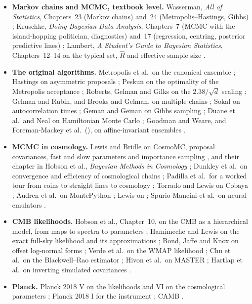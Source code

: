 \begin{itemize}[itemsep=2pt,leftmargin=1.2em]
  \item \textbf{Markov chains and MCMC, textbook level.} Wasserman, \emph{All of Statistics}, Chapters~23 (Markov chains)
        and~24 (Metropolis--Hastings, Gibbs) ; Kruschke, \emph{Doing Bayesian Data Analysis},
        Chapters~7 (MCMC with the island-hopping politician, diagnostics) and~17 (regression, centring, posterior
        predictive lines) ; Lambert, \emph{A Student's Guide to Bayesian Statistics},
        Chapters~12--14 on the typical set, $\hat R$ and effective sample size .
  \item \textbf{The original algorithms.} Metropolis et al.\ on the canonical ensemble \cite{Metropolis1953}; Hastings on
        asymmetric proposals \cite{Hastings1970}; Peskun on the optimality of the Metropolis acceptance \cite{Peskun1973};
        Roberts, Gelman and Gilks on the $2.38/\sqrt d$ scaling \cite{RobertsGelmanGilks1997}; Gelman and Rubin, and Brooks
        and Gelman, on multiple chains \cite{GelmanRubin1992,BrooksGelman1998}; Sokal on autocorrelation times
        \cite{Sokal1997}; Geman and Geman on Gibbs sampling \cite{GemanGeman1984}; Duane et al.\ and Neal on Hamiltonian
        Monte Carlo \cite{Duane1987,Neal2011}; Goodman and Weare, and Foreman-Mackey et al.\ (), on
        affine-invariant ensembles \cite{GoodmanWeare2010,ForemanMackey2013}.
  \item \textbf{MCMC in cosmology.} Lewis and Bridle on CosmoMC, proposal covariances, fast and slow parameters and
        importance sampling \cite{LewisBridle2002}, and their chapter in Hobson et al., \emph{Bayesian Methods in Cosmology}
        ; Dunkley et al.\ on convergence and efficiency of cosmological chains \cite{Dunkley2005};
        Padilla et al.\ for a worked tour from coins to straight lines to cosmology \cite{Padilla2019}; Torrado and Lewis on
        Cobaya \cite{Torrado2021}; Audren et al.\ on MontePython \cite{Audren2013}; Lewis on 
        \cite{Lewis2019GetDist}; Spurio Mancini et al.\ on neural emulators \cite{SpurioMancini2022}.
  \item \textbf{CMB likelihoods.} Hobson et al., Chapter~10, on the CMB as a hierarchical model, from maps to spectra to
        parameters ; Hamimeche and Lewis on the exact full-sky likelihood and its
        approximations \cite{HamimecheLewis2008}; Bond, Jaffe and Knox on offset log-normal forms \cite{BondJaffeKnox2000};
        Verde et al.\ on the WMAP likelihood \cite{Verde2003}; Chu et al.\ on the Blackwell--Rao estimator \cite{Chu2005};
        Hivon et al.\ on MASTER \cite{Hivon2002}; Hartlap et al.\ on inverting simulated covariances \cite{Hartlap2007}.
  \item \textbf{Planck.} Planck 2018 V on the likelihoods \cite{Planck2018V} and VI on the cosmological parameters
        \cite{Planck2018VI}; Planck 2018 I for the instrument \cite{Planck2018I}; CAMB \cite{CAMB2000}.
\end{itemize}

